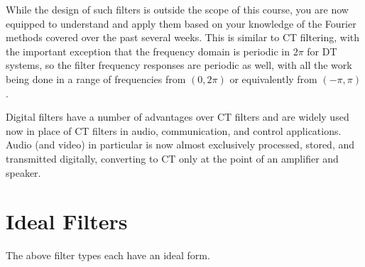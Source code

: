 While the design of such filters is outside the scope of this course, you are now equipped to understand and apply them based on your knowledge of the Fourier methods covered over the past several weeks. This is similar to CT filtering, with the important exception that the frequency domain is periodic in $2\pi$ for DT systems, so the filter frequency responses are periodic as well, with all the work being done in a range of frequencies from $(0,2\pi)$ or equivalently from $(-\pi,\pi)$. 

Digital filters have a number of advantages over CT filters and are widely used now in place of CT filters in audio, communication, and control applications. Audio (and video) in particular is now almost exclusively processed, stored, and transmitted digitally, converting to CT only at the point of an amplifier and speaker. 

\section{Ideal Filters}

The above filter types each have an ideal form.

